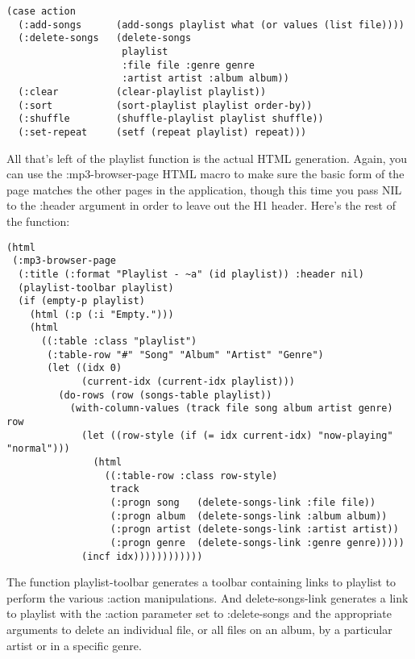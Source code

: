 \begin{lstlisting}
(case action
  (:add-songs      (add-songs playlist what (or values (list file))))
  (:delete-songs   (delete-songs 
                    playlist 
                    :file file :genre genre
                    :artist artist :album album))
  (:clear          (clear-playlist playlist))
  (:sort           (sort-playlist playlist order-by))
  (:shuffle        (shuffle-playlist playlist shuffle))
  (:set-repeat     (setf (repeat playlist) repeat)))
\end{lstlisting}

All that's left of the playlist function is the actual HTML generation. Again, you can use
the :mp3-browser-page HTML macro to make sure the basic form of the page matches the other
pages in the application, though this time you pass NIL to the :header argument in order
to leave out the H1 header. Here's the rest of the function:

\begin{lstlisting}
(html
 (:mp3-browser-page
  (:title (:format "Playlist - ~a" (id playlist)) :header nil)
  (playlist-toolbar playlist)
  (if (empty-p playlist)
    (html (:p (:i "Empty.")))
    (html 
      ((:table :class "playlist")
       (:table-row "#" "Song" "Album" "Artist" "Genre")
       (let ((idx 0)
             (current-idx (current-idx playlist)))
         (do-rows (row (songs-table playlist))
           (with-column-values (track file song album artist genre) row
             (let ((row-style (if (= idx current-idx) "now-playing" "normal")))
               (html
                 ((:table-row :class row-style)
                  track
                  (:progn song   (delete-songs-link :file file))
                  (:progn album  (delete-songs-link :album album))
                  (:progn artist (delete-songs-link :artist artist))
                  (:progn genre  (delete-songs-link :genre genre)))))
             (incf idx))))))))))))
\end{lstlisting}

The function playlist-toolbar generates a toolbar containing links to playlist to perform
the various :action manipulations. And delete-songs-link generates a link to playlist with
the :action parameter set to :delete-songs and the appropriate arguments to delete an
individual file, or all files on an album, by a particular artist or in a specific genre.

